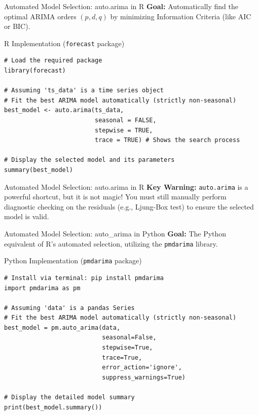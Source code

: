 \documentclass[aspectratio=169]{beamer}
\begin{document}
\begin{frame}[fragile]{Automated Model Selection: auto.arima in R}
\small
\textbf{Goal:} Automatically find the optimal ARIMA orders $(p,d,q)$ by minimizing Information Criteria (like AIC or BIC).

\vspace{0.2cm}

\begin{block}{R Implementation (\texttt{forecast} package)}
\begin{verbatim}
# Load the required package
library(forecast)

# Assuming 'ts_data' is a time series object
# Fit the best ARIMA model automatically (strictly non-seasonal)
best_model <- auto.arima(ts_data, 
                         seasonal = FALSE, 
                         stepwise = TRUE, 
                         trace = TRUE) # Shows the search process

# Display the selected model and its parameters
summary(best_model)
\end{verbatim}
\end{block}
\end{frame}

\begin{frame}[fragile]{Automated Model Selection: auto.arima in R}
\vspace{0.2cm}
\textbf{Key Warning:} \texttt{auto.arima} is a powerful shortcut, but it is not magic! You must still manually perform diagnostic checking on the residuals (e.g., Ljung-Box test) to ensure the selected model is valid.
\end{frame}

\begin{frame}[fragile]{Automated Model Selection: auto\_arima in Python}
\small
\textbf{Goal:} The Python equivalent of R's automated selection, utilizing the \texttt{pmdarima} library.

\vspace{0.2cm}

\begin{block}{Python Implementation (\texttt{pmdarima} package)}
\begin{verbatim}
# Install via terminal: pip install pmdarima
import pmdarima as pm

# Assuming 'data' is a pandas Series
# Fit the best ARIMA model automatically (strictly non-seasonal)
best_model = pm.auto_arima(data, 
                           seasonal=False, 
                           stepwise=True, 
                           trace=True,
                           error_action='ignore', 
                           suppress_warnings=True)

# Display the detailed model summary
print(best_model.summary())
\end{verbatim}
\end{block}
\end{frame}
\end{document}
